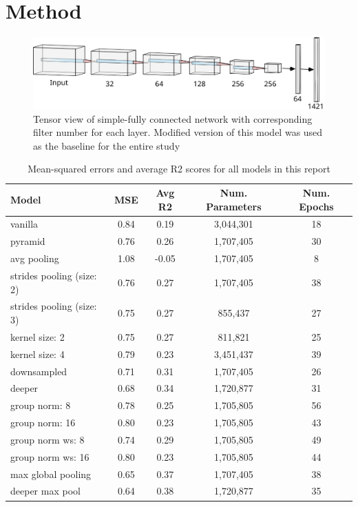 \documentclass{article}
\begin{document}
    \section*{Method}
    \begin{figure}[h]
        \centering
        \includegraphics[scale=0.8]{nn}
        \centering
        \caption{Tensor view of simple-fully connected network with corresponding filter number for each layer. Modified version of this model was used as the baseline for the entire study}
        \label{fig:sfcn}
    \end{figure}
    \begin{table}[h!]
        \begin{tabular}{||l c c c c||}
            \hline
            Model & MSE & Avg R2 & Num. Parameters & Num. Epochs \\
            \hline\hline
            vanilla & 0.84 & 0.19 & 3,044,301 & 18 \\
            \hline
            pyramid & 0.76 & 0.26 & 1,707,405 & 30 \\
            \hline
            avg pooling & 1.08 & -0.05 & 1,707,405 & 8 \\
            \hline
            strides pooling (size: 2) & 0.76 & 0.27 & 1,707,405 & 38 \\
            \hline
            strides pooling (size: 3) & 0.75 & 0.27 & 855,437 & 27 \\
            \hline
            kernel size: 2 & 0.75 & 0.27 & 811,821 & 25 \\
            \hline
            kernel size: 4 & 0.79 & 0.23 & 3,451,437 & 39 \\
            \hline
            downsampled & 0.71 & 0.31 & 1,707,405 & 26 \\
            \hline
            deeper & 0.68 & 0.34 & 1,720,877 & 31 \\
            \hline
            group norm: 8 & 0.78 & 0.25 & 1,705,805 & 56 \\
            \hline
            group norm: 16 & 0.80 & 0.23 & 1,705,805 & 43 \\
            \hline
            group norm ws: 8 & 0.74 & 0.29 & 1,705,805 & 49 \\
            \hline
            group norm ws: 16 & 0.80 & 0.23 & 1,705,805 & 44 \\ 
            \hline
            max global pooling & 0.65 & 0.37 & 1,707,405 & 38 \\
            \hline
            deeper max pool & 0.64 & 0.38 & 1,720,877 & 35 \\
            \hline
        \end{tabular}
        \caption{Mean-squared errors and average R2 scores for all models in this report}
        \label{table:1}
    \end{table}
\end{document}
